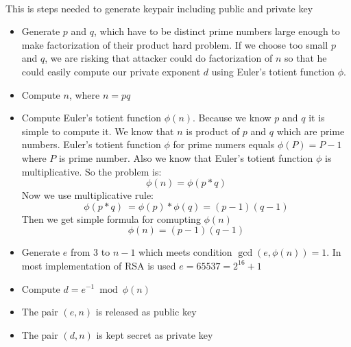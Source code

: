 \documentclass[thesis=B,english]{FITthesis}[2012/10/20]
\begin{document}
\paragraph*{}
{This is steps needed to generate keypair including public and private key}
\begin{itemize}
 \item Generate \(p\) and \(q\), which have to be distinct prime numbers large enough to make factorization of their product hard problem. If we choose too small \(p\) and \(q\), we are risking that attacker could do factorization of \(n\) so that he could easily compute our private exponent \(d\) using Euler's totient function \(\phi\).
 \item Compute \(n\), where \(n = p  q\)
 \item Compute Euler's totient function \(\phi(n)\). Because we know \(p\) and \(q\) it is simple to compute it. We know that  \(n\) is product of \(p\) and \(q\) which are prime numbers. Euler's totient function \(\phi\) for prime numers equals \(\phi(P) = P -1\) where \(P\) is prime number. Also we know that Euler's totient function \(\phi\) is multiplicative. So the problem is:
 \[\phi(n) = \phi(p*q)\]
 Now we use multiplicative rule:
 \[\phi(p*q)\ = \phi(p)* \phi(q) = (p - 1)(q - 1)\]
 Then we get simple formula for comupting \(\phi(n)\)
 \[\phi(n) = (p - 1)(q - 1)\]
 \item Generate \(e\) from 3 to  \(n - 1\) which meets condition \(\gcd(e,\phi(n)) = 1\). In most implementation of RSA is used \(e = 65537 = 2^{16} + 1\)
 \item Compute \(d = e^{-1}\bmod{\phi(n)} \)
 \item The pair \((e,n)\) is released as public key
 \item The pair \((d,n)\) is kept secret as private key
\end{itemize}
\end{document}
